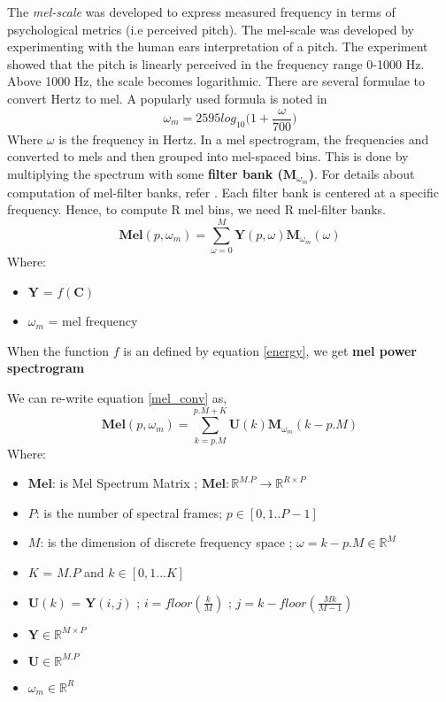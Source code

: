 The \textit{mel-scale} was developed to express measured frequency in terms of psychological metrics (i.e perceived pitch). The mel-scale was developed
by experimenting with the human ears interpretation of a pitch. The experiment showed that the pitch is linearly perceived in the frequency range 0-1000 Hz. Above
1000 Hz, the scale becomes logarithmic. There are several formulae to convert Hertz to mel. A popularly used formula is noted in \cite{speech}
\begin{equation}
\omega_{m} = 2595log_{10}\bigg(1+\frac{ \omega }{700}\bigg)
\end{equation}
Where $\omega$ is the frequency in Hertz. In a mel spectrogram, the frequencies and converted to mels and then grouped into mel-spaced bins. This is done by multiplying the spectrum with some \textbf{filter bank ($\textbf{M}_{\omega_{m}}$)}. For details about computation of mel-filter banks, refer \cite{mel}. Each filter bank is centered at a specific frequency. Hence, to compute R mel bins, we need R mel-filter banks. 
\begin{equation}
\label{mel_conv}
\textbf{Mel}(p,\omega_{m}) = \displaystyle\sum_{ \omega = 0}^{M}\textbf{Y}(p, \omega)\textbf{M}_{\omega_{m}}(\omega)
\end{equation}
Where:
\begin{itemize}[label=]
    \setlength\itemsep{0em}
    \item $\textbf{Y}$ = $f(\textbf{C})$
    \item $\omega_{m}$ = mel frequency
\end{itemize}    
When the function $f$ is an defined by equation \ref{energy}, we get \textbf{mel power spectrogram}
\bigskip

\noindent We can re-write equation \ref{mel_conv} as, 
\begin{equation}
\label{mel_conv_flat}
\textbf{Mel}(p,\omega_{m}) = \displaystyle\sum_{k=p.M}^{p.M + K}\textbf{U}(k)\textbf{M}_{\omega_{m}}(k-p.M)
\end{equation}
Where:
\begin{itemize}[label=]
    \setlength\itemsep{0em}
    \item $\textbf{Mel}$: is Mel Spectrum Matrix ; $\textbf{Mel} : \mathbb{R}^{M.P} \rightarrow \mathbb{R}^{R \times P}$
    \item $P$: is the number of spectral frames; $p \in [0,1..P-1]$ 
    \item $M$: is the dimension of discrete frequency space ; $\omega = k-p.M \in \mathbb{R}^{M}$
    \item $K$ = $M.P$ and $k \in [0,1...K]$
    \item $\textbf{U}(k)$ = $\textbf{Y}(i,j)$ ; $i = floor(\frac{k}{M})$ ; $j = k-floor(\frac{Mk}{M-1})$
    \item $\textbf{Y} \in \mathbb{R}^{M \times P}$
    \item $\textbf{U} \in \mathbb{R}^{M.P}$
    \item $\omega_{m} \in  \mathbb{R}^{R}$
\end{itemize}

